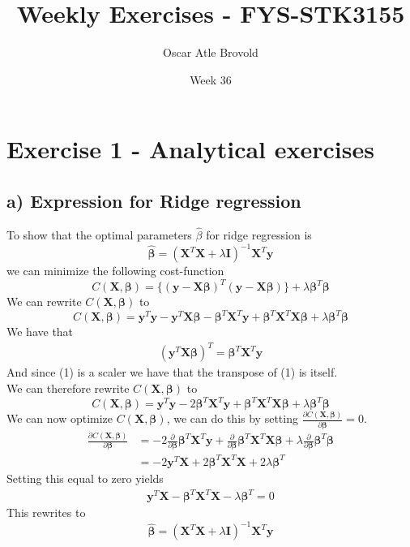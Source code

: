 \documentclass{article}
\title{Weekly Exercises - FYS-STK3155}
\author{Oscar Atle Brovold}
\date{Week 36}
\begin{document}
\maketitle
\section*{Exercise 1 - Analytical exercises}
\subsection*{a) Expression for Ridge regression}
To show that the optimal parameters $\hat{\beta}$ for 
ridge regression is 
$$\bm{\hat{\beta}} = (\mathbf{X}^{T}\mathbf{X} + \lambda\mathbf{I})^{-1}\mathbf{X}^{T}\bm{y}$$ 
we can minimize the following cost-function
$$C(\mathbf{X}, \bm{\beta}) = \{(\bm{y} - \mathbf{X}\bm{\beta})^{T}(\bm{y} - \mathbf{X}\bm{\beta})\} + \lambda\bm{\beta}^{T}\bm{\beta}$$
We can rewrite $C(\mathbf{X}, \bm{\beta})$ to 
$$C(\mathbf{X}, \bm{\beta}) = \bm{y}^{T}\bm{y} - \bm{y}^{T}\mathbf{X}\bm{\beta} - \bm{\beta}^{T}\mathbf{X}^{T}\bm{y} + \bm{\beta}^{T}\mathbf{X}^{T}\mathbf{X}\bm{\beta} + \lambda\bm{\beta}^{T}\bm{\beta}$$
We have that
\begin{align}
    (\bm{y}^{T}\mathbf{X}\bm{\beta})^{T} = \bm{\beta}^{T}\mathbf{X}^{T}\bm{y}  
\end{align}
And since (1) is a scaler we have that the transpose of (1) is itself. \\
We can therefore rewrite $C(\mathbf{X}, \bm{\beta})$ to
$$C(\mathbf{X}, \bm{\beta}) = \bm{y}^{T}\bm{y} - 2\bm{\beta}^{T}\mathbf{X}^{T}\bm{y} + \bm{\beta}^{T}\mathbf{X}^{T}\mathbf{X}\bm{\beta} + \lambda\bm{\beta}^{T}\bm{\beta}$$
We can now optimize $C(\mathbf{X}, \bm{\beta})$, we can do this by setting $\frac{\partial C(\mathbf{X}, \bm{\beta})}{\partial \bm{\beta}} = 0.$
\begin{align*}
    \frac{\partial C(\mathbf{X}, \bm{\beta})}{\partial \bm{\beta}} &= -2\frac{\partial}{\partial\bm{\beta}}  \bm{\beta}^{T}\mathbf{X}^{T}\bm{y} +  \frac{\partial}{\partial \bm{\beta}} \bm{\beta}^{T}\mathbf{X}^{T}\mathbf{X}\bm{\beta} + \lambda \frac{\partial}{\partial \bm{\beta}} \bm{\beta}^T\bm{\beta} \\
    &= -2\bm{y}^{T}\mathbf{X} + 2\bm{\beta}^{T}\mathbf{X}^{T}\mathbf{X} + 2 \lambda \bm{\beta}^{T}
\end{align*}
Setting this equal to zero yields
\begin{align*}
    \bm{y}^{T}\mathbf{X} - \bm{\beta}^{T}\mathbf{X}^{T}\mathbf{X} - \lambda \bm{\beta}^{T} = 0
\end{align*}
This rewrites to
$$\bm{\hat{\beta}} = (\mathbf{X}^{T}\mathbf{X} + \lambda\mathbf{I})^{-1}\mathbf{X}^{T}\bm{y}$$ 
\end{document}
